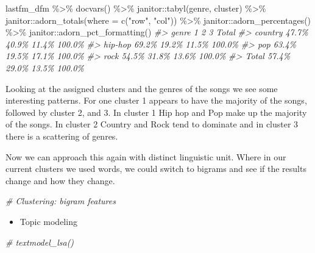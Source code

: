 \documentclass[
]{article}
\newenvironment{Shaded}{\begin{snugshade}}{\end{snugshade}}
\newcommand{\AttributeTok}[1]{\textcolor[rgb]{0.77,0.63,0.00}{#1}}
\newcommand{\CommentTok}[1]{\textcolor[rgb]{0.56,0.35,0.01}{\textit{#1}}}
\newcommand{\FunctionTok}[1]{\textcolor[rgb]{0.00,0.00,0.00}{#1}}
\newcommand{\NormalTok}[1]{#1}
\newcommand{\SpecialCharTok}[1]{\textcolor[rgb]{0.00,0.00,0.00}{#1}}
\newcommand{\StringTok}[1]{\textcolor[rgb]{0.31,0.60,0.02}{#1}}
\providecommand{\tightlist}{%
  \setlength{\itemsep}{0pt}\setlength{\parskip}{0pt}}
\begin{document}
\begin{Shaded}
\begin{Highlighting}[]
\NormalTok{lastfm\_dfm }\SpecialCharTok{\%\textgreater{}\%}
    \FunctionTok{docvars}\NormalTok{() }\SpecialCharTok{\%\textgreater{}\%}
\NormalTok{    janitor}\SpecialCharTok{::}\FunctionTok{tabyl}\NormalTok{(genre, cluster) }\SpecialCharTok{\%\textgreater{}\%}
\NormalTok{    janitor}\SpecialCharTok{::}\FunctionTok{adorn\_totals}\NormalTok{(}\AttributeTok{where =} \FunctionTok{c}\NormalTok{(}\StringTok{"row"}\NormalTok{, }\StringTok{"col"}\NormalTok{)) }\SpecialCharTok{\%\textgreater{}\%}
\NormalTok{    janitor}\SpecialCharTok{::}\FunctionTok{adorn\_percentages}\NormalTok{() }\SpecialCharTok{\%\textgreater{}\%}
\NormalTok{    janitor}\SpecialCharTok{::}\FunctionTok{adorn\_pct\_formatting}\NormalTok{()}
\CommentTok{\#\textgreater{}    genre     1     2     3  Total}
\CommentTok{\#\textgreater{}  country 47.7\% 40.9\% 11.4\% 100.0\%}
\CommentTok{\#\textgreater{}  hip{-}hop 69.2\% 19.2\% 11.5\% 100.0\%}
\CommentTok{\#\textgreater{}      pop 63.4\% 19.5\% 17.1\% 100.0\%}
\CommentTok{\#\textgreater{}     rock 54.5\% 31.8\% 13.6\% 100.0\%}
\CommentTok{\#\textgreater{}    Total 57.4\% 29.0\% 13.5\% 100.0\%}
\end{Highlighting}
\end{Shaded}

Looking at the assigned clusters and the genres of the songs we see some interesting patterns. For one cluster 1 appears to have the majority of the songs, followed by cluster 2, and 3. In cluster 1 Hip hop and Pop make up the majority of the songs. In cluster 2 Country and Rock tend to dominate and in cluster 3 there is a scattering of genres.

Now we can approach this again with distinct linguistic unit. Where in our current clusters we used words, we could switch to bigrams and see if the results change and how they change.

\begin{Shaded}
\begin{Highlighting}[]
\CommentTok{\# Clustering: bigram features}
\end{Highlighting}
\end{Shaded}

\begin{itemize}
\tightlist
\item
  Topic modeling
\end{itemize}

\begin{Shaded}
\begin{Highlighting}[]
\CommentTok{\# textmodel\_lsa()}
\end{Highlighting}
\end{Shaded}
\end{document}
